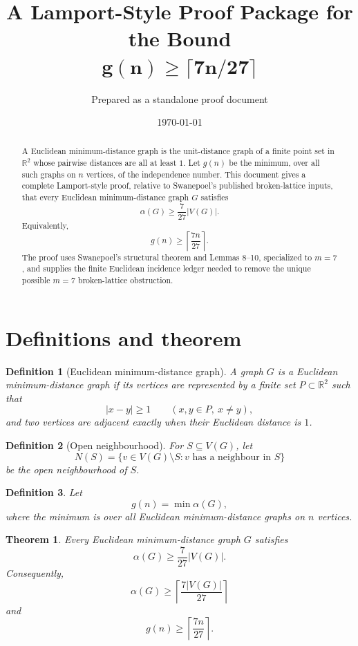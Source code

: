 \documentclass[11pt]{article}
\title{A Lamport-Style Proof Package for the Bound\\ $\boldsymbol{g(n)\ge \lceil 7n/27\rceil}$}
\author{Prepared as a standalone proof document}
\date{\today}
\newtheorem{theorem}{Theorem}
\newtheorem{definition}{Definition}
\newcommand{\R}{\mathbb{R}}
\begin{document}
\maketitle

\begin{abstract}
A Euclidean minimum-distance graph is the unit-distance graph of a finite point set in $\R^2$ whose pairwise distances are all at least $1$.  Let $g(n)$ be the minimum, over all such graphs on $n$ vertices, of the independence number.  This document gives a complete Lamport-style proof, relative to Swanepoel's published broken-lattice inputs, that every Euclidean minimum-distance graph $G$ satisfies
\[
  \alpha(G)\ge \frac{7}{27}|V(G)|.
\]
Equivalently,
\[
  g(n)\ge \left\lceil \frac{7n}{27}\right\rceil .
\]
The proof uses Swanepoel's structural theorem and Lemmas 8--10, specialized to $m=7$, and supplies the finite Euclidean incidence ledger needed to remove the unique possible $m=7$ broken-lattice obstruction.
\end{abstract}

\tableofcontents
\newpage

\section{Definitions and theorem}

\begin{definition}[Euclidean minimum-distance graph]
A graph $G$ is a Euclidean minimum-distance graph if its vertices are represented by a finite set $P\subset\R^2$ such that
\[
  |x-y|\ge 1\qquad(x,y\in P,\ x\ne y),
\]
and two vertices are adjacent exactly when their Euclidean distance is $1$.
\end{definition}

\begin{definition}[Open neighbourhood]
For $S\subseteq V(G)$, let
\[
  N(S)=\{v\in V(G)\setminus S: v\text{ has a neighbour in }S\}
\]
be the open neighbourhood of $S$.
\end{definition}

\begin{definition}
Let
\[
  g(n)=\min \alpha(G),
\]
where the minimum is over all Euclidean minimum-distance graphs on $n$ vertices.
\end{definition}

\begin{theorem}\label{thm:main}
Every Euclidean minimum-distance graph $G$ satisfies
\[
  \alpha(G)\ge \frac{7}{27}|V(G)|.
\]
Consequently,
\[
  \alpha(G)\ge \left\lceil \frac{7|V(G)|}{27}\right\rceil
\]
and
\[
  g(n)\ge \left\lceil \frac{7n}{27}\right\rceil .
\]
\end{theorem}
\end{document}
